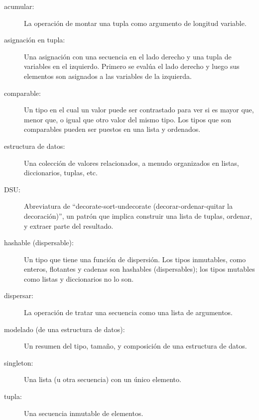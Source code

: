 \begin{description}

\item[acumular:] La operación de montar una tupla
como argumento de longitud variable.

\item[asignación en tupla:] Una asignación con una secuencia en el
lado derecho y una tupla de variables en el izquierdo. Primero
se evalúa el lado derecho y luego sus elementos son asignados a las
variables de la izquierda.

\item[comparable:] Un tipo en el cual un valor puede ser contrastado para ver si es
mayor que, menor que, o igual que otro valor del mismo tipo.
Los tipos que son comparables pueden ser puestos en una lista y ordenados.

\item[estructura de datos:] Una colección de valores relacionados, a menudo
organizados en listas, diccionarios, tuplas, etc.

\item[DSU:] Abreviatura de ``decorate-sort-undecorate
(decorar-ordenar-quitar la decoración)'',
un patrón que implica construir una lista de tuplas, ordenar, y
extraer parte del resultado.

\item[hashable (dispersable):] Un tipo que tiene una función de dispersión. Los tipos
inmutables, como enteros,
flotantes y cadenas son hashables (dispersables); los tipos mutables como listas y
diccionarios no lo son.

\item[dispersar:] La operación de tratar una secuencia como una lista de
argumentos.

\item[modelado (de una estructura de datos):] Un resumen del tipo,
tamaño, y composición de una estructura de datos.

\item[singleton:] Una lista (u otra secuencia) con un único elemento.

\item[tupla:] Una secuencia inmutable de elementos.

\end{description}


